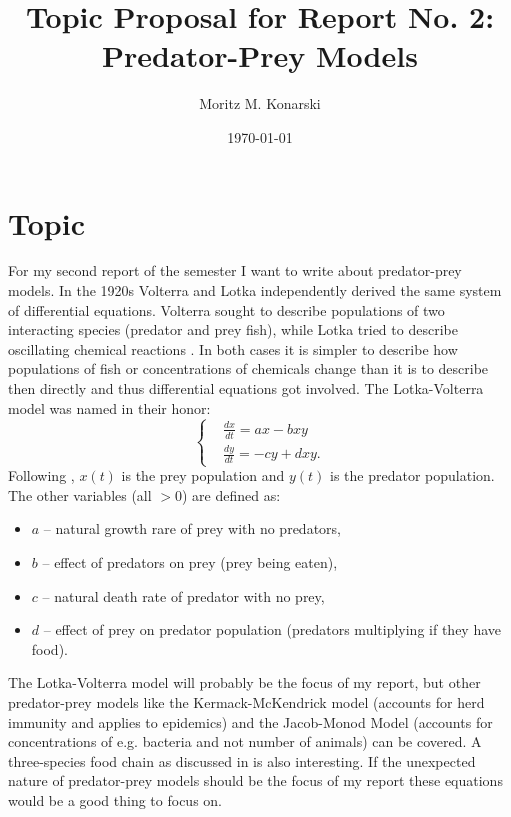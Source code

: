 \documentclass[a4paper,reqno,12pt]{article}
\title{Topic Proposal for Report No. 2:\\Predator-Prey Models}
\author{Moritz M. Konarski}
\date{\today}
\begin{document}
\maketitle

\section{Topic}

For my second report of the semester I want to write about predator-prey
models. In the 1920s Volterra and Lotka independently derived the same system
of differential equations. Volterra sought to describe populations of two
interacting species (predator and prey fish), while Lotka tried to describe
oscillating chemical reactions \cite{chauvet}. In both cases it is simpler to
describe how populations of fish or concentrations of chemicals change than it
is to describe then directly and thus differential equations got involved. The 
Lotka-Volterra model was named in their honor:
\begin{equation}\nonumber
    \left\{\begin{aligned}
        &\frac{dx}{dt} = ax - bxy \\
        &\frac{dy}{dt} = -cy + dxy.
    \end{aligned}\right.
\end{equation}
Following \cite{chauvet}, $x(t)$ is the prey population and $y(t)$ is the
predator population. The other variables (all $>0$) are defined as:
\begin{itemize}
    \item $a$ -- natural growth rare of prey with no predators,
    \item $b$ -- effect of predators on prey (prey being eaten),
    \item $c$ -- natural death rate of predator with no prey,
    \item $d$ -- effect of prey on predator population (predators multiplying
        if they have food).
\end{itemize}

The Lotka-Volterra model will probably be the focus of my report, but other
predator-prey models like the Kermack-McKendrick model (accounts for herd
immunity and applies to epidemics) and the Jacob-Monod Model (accounts for
concentrations of e.g. bacteria and not number of animals) \cite{hoppensteadt} 
can be covered. A three-species food chain as discussed in \cite{chauvet} is
also interesting. If the unexpected nature of predator-prey models should be 
the focus of my report these equations would be a good thing to focus on.
\end{document}
